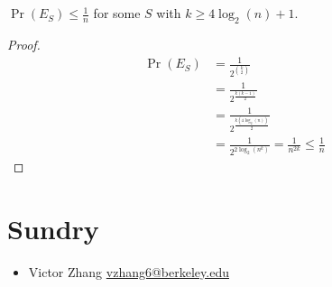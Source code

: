 \documentclass{article}
\begin{document}
\subsection{}

\begin{theorem}
    \(\Pr(E_S) \leqslant \frac{1}{n}\) for some \(S\) with \(k \geqslant 4 \log_2(n) + 1\).
\end{theorem}
\begin{proof}
    \begin{align}
        \Pr(E_S) &= \frac{1}{2^{\binom{k}{2}}} \\
        &= \frac{1}{2^{\frac{k (k - 1)}{2}}} \\
        &= \frac{1}{2^{\frac{k (4 \log_2(n))}{2}}} \\
        &= \frac{1}{2^{2 \log_2(n^k)}} = \frac{1}{n^{2k}} \leqslant \frac{1}{n}
    \end{align}
\end{proof}

\section{Sundry}

\begin{itemize}
    \item Victor Zhang \href{mailto:vzhang6@berkeley.edu}{vzhang6@berkeley.edu}
\end{itemize}
\end{document}
